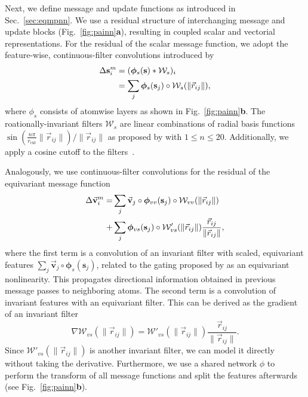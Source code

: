 \documentclass[reprint,
amsmath,amssymb,
 aip,jcp
]{revtex4-2}
\newcommand{\rr}{\vec{r}}
\newcommand{\q}{\mathbf{s}}
\newcommand{\mmu}{\vec{\mathbf{v}}}
\begin{document}
Next, we define message and update functions as introduced in Sec.~\ref{sec:eqmpnn}.
We use a residual structure of interchanging message and update blocks (Fig.~\ref{fig:painn}\textbf{a}), resulting in coupled scalar and vectorial representations.
For the residual of the scalar message function, we adopt the feature-wise, continuous-filter convolutions introduced by \citet{schutt2017schnet}
\begin{align}
\Delta \q_i^m &= (\bm{\phi}_{s}(\q) * \mathcal{W}_{s})_i \\ 
&= \sum_{j} \bm{\phi}_{s}(\q_j) \circ \mathcal{W}_{s}(\|\rr_{ij}\|), \notag
\end{align}
where $\phi_s$ consists of atomwise layers as shown in Fig.~\ref{fig:painn}\textbf{b}.
The roationally-invariant filters $\mathcal{W}_s$ are linear combinations of radial basis functions 
$ \sin(\frac{n \pi}{r_\text{cut}} \| \rr_{ij} \|) / \| \rr_{ij} \| $ as proposed by \citet{klicpera2020directional} with $1 \leq n \leq 20$.
Additionally, we apply a cosine cutoff to the filters~\cite{behler2011atom}.

Analogously, we use continuous-filter convolutions for the residual of the equivariant message function
\begin{align}
\Delta \mmu_i^m = &\sum_{j} \mmu_j \circ \bm{\phi}_{vv}(\q_j) \circ \mathcal{W}_{vv}(\|\rr_{ij}\|) \label{eq:msgv} \\
+ &\sum_{j}\bm{\phi}_{vs}(\q_j) \circ \mathcal{W}'_{vs}(\|\rr_{ij}\|) \frac{\rr_{ij}}{\|\rr_{ij}\|}, \notag
\end{align}
where the first term is a convolution of an invariant filter with scaled, equivariant features $\sum_{j} \mmu_j \circ \bm{\phi}_s(\q_j)$, related to the gating proposed by \citet{weiler20183d} as an equivariant nonlinearity.
This propagates directional information obtained in previous message passes to neighboring atoms.
The second term is a convolution of invariant features with an equivariant filter.
This can be derived as the gradient of an invariant filter 
\[
\nabla \mathcal{W}_{vs}(\|\rr_{ij}\|) = \mathcal{W}'_{vs}(\|\rr_{ij}\|) \frac{\rr_{ij}}{\|\rr_{ij}\|}.
\]
Since $\mathcal{W}'_{vs}(\|\rr_{ij}\|)$ is another invariant filter, we can model it directly without taking the derivative.
Furthermore, we use a shared network $\phi$ to perform the transform of all message functions and split the features afterwards (see Fig.~\ref{fig:painn}\textbf{b}).
\end{document}
